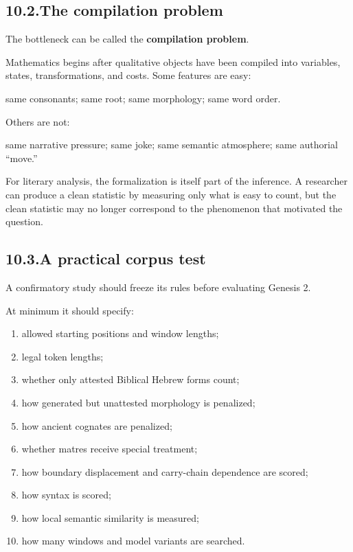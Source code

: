 \subsection*{10.2.\quad The compilation problem}

The bottleneck can be called the \textbf{compilation problem}.

Mathematics begins after qualitative objects have been compiled into variables, states, transformations, and costs.  Some features are easy:

\begin{center}
same consonants; same root; same morphology; same word order.
\end{center}

Others are not:

\begin{center}
same narrative pressure; same joke; same semantic atmosphere; same authorial ``move.''
\end{center}

For literary analysis, the formalization is itself part of the inference.  A researcher can produce a clean statistic by measuring only what is easy to count, but the clean statistic may no longer correspond to the phenomenon that motivated the question.

\subsection*{10.3.\quad A practical corpus test}

A confirmatory study should freeze its rules before evaluating Genesis 2.

At minimum it should specify:

\begin{enumerate}
\item allowed starting positions and window lengths;
\item legal token lengths;
\item whether only attested Biblical Hebrew forms count;
\item how generated but unattested morphology is penalized;
\item how ancient cognates are penalized;
\item whether matres receive special treatment;
\item how boundary displacement and carry-chain dependence are scored;
\item how syntax is scored;
\item how local semantic similarity is measured;
\item how many windows and model variants are searched.
\end{enumerate}

